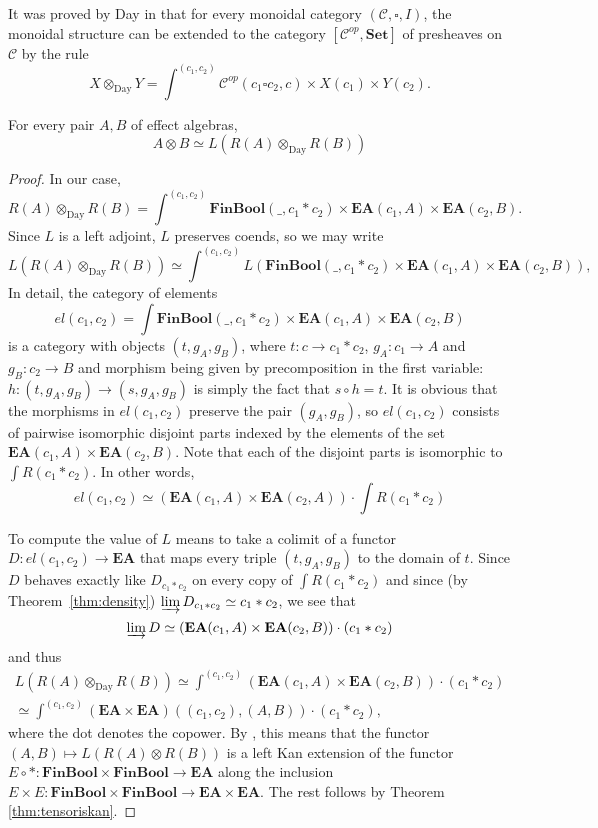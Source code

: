 \documentclass[smallextended]{svjour3}
\begin{document}
It was proved by Day in \cite{day1970onclosed} that for every 
monoidal category $({\mathcal{C}},\square,I)$, the monoidal
structure can be extended to the category 
$[{\mathcal{C}}^{op},{\mathbf{Set}}]$ of presheaves on ${\mathcal{C}}$ by the rule
$$
X{\otimes_{\mathrm{Day}}} Y=\int^{(c_1,c_2)}{\mathcal{C}}^{op}(c_1\square c_2,c)\times X(c_1)\times Y(c_2).
$$
\begin{theorem}
For every pair $A,B$ of effect algebras,
$$
A\otimes B\simeq L(R(A){\otimes_{\mathrm{Day}}} R(B))
$$
\end{theorem}
\begin{proof}
In our case,
$$
R(A){\otimes_{\mathrm{Day}}} R(B)=\int^{(c_1,c_2)}
	{\mathbf{FinBool}}(\_,c_1*c_2)\times{\mathbf{EA}}(c_1,A)\times{\mathbf{EA}}(c_2,B).
$$
Since $L$ is a left adjoint, $L$ preserves coends, so we may write
$$
L(R(A){\otimes_{\mathrm{Day}}} R(B))\simeq\int^{(c_1,c_2)}
	L({\mathbf{FinBool}}(\_,c_1*c_2)\times{\mathbf{EA}}(c_1,A)\times{\mathbf{EA}}(c_2,B)),
$$
In detail, the category of elements
\begin{equation}
el(c_1,c_2)=\int {\mathbf{FinBool}}(\_,c_1*c_2)\times{\mathbf{EA}}(c_1,A)\times{\mathbf{EA}}(c_2,B)
\end{equation}
is a category with objects $(t,g_A,g_B)$, where $t:c\to c_1*c_2$, $g_A:c_1\to A$
and $g_B:c_2\to B$ and morphism being given by precomposition in the first variable:
$h:(t,g_A,g_B)\to (s,g_A,g_B)$ is simply the fact that $s\circ h=t$.
It is obvious that the morphisms in $el(c_1,c_2)$ preserve the pair $(g_A,g_B)$, so
$el(c_1,c_2)$ consists of pairwise isomorphic disjoint parts indexed by the elements of
the set ${\mathbf{EA}}(c_1,A)\times{\mathbf{EA}}(c_2,B)$. Note that each of the disjoint parts is isomorphic
to ${\int R({c_1*c_2})}$. In other words, 
$$
el(c_1,c_2)\simeq ({\mathbf{EA}}(c_1,A)\times{\mathbf{EA}}(c_2,A))\cdot \int R(c_1*c_2)
$$

To compute the value of $L$ means to take a colimit of a functor 
$D:el(c_1,c_2)\to{\mathbf{EA}}$ that maps every triple $(t,g_A,g_B)$ to the domain of
$t$.
Since $D$ behaves exactly like $D_{c_1*c_2}$ on every copy of $\int R(c_1*c_2)$
and since (by Theorem~\ref{thm:density}) $\varinjlim D_{c_1*c_2}\simeq c_1*c_2$,
we see that
$$
\varinjlim D\simeq ({\mathbf{EA}}(c_1,A)\times{\mathbf{EA}}(c_2,B))\cdot(c_1*c_2)
$$
and thus
\begin{align*}
L(R(A){\otimes_{\mathrm{Day}}} R(B))\simeq \int^{(c_1,c_2)}
	({\mathbf{EA}}(c_1,A)\times{\mathbf{EA}}(c_2,B))\cdot(c_1*c_2)\\
	\simeq \int^{(c_1,c_2)}({\mathbf{EA}}\times{\mathbf{EA}})((c_1,c_2),(A,B))\cdot(c_1*c_2),
\end{align*}
where the dot denotes the copower.
By \cite[Theorem X.4.1]{mac1998categories}, this means that 
the functor $(A,B)\mapsto L(R(A)\otimes R(B))$ is
a left Kan extension of the functor $E\circ *:{\mathbf{FinBool}}\times{\mathbf{FinBool}}\to{\mathbf{EA}}$ 
along the inclusion $E\times E:{\mathbf{FinBool}}\times{\mathbf{FinBool}}\to{\mathbf{EA}}\times{\mathbf{EA}}$.
The rest follows by Theorem \ref{thm:tensoriskan}.
\end{proof}
\end{document}
